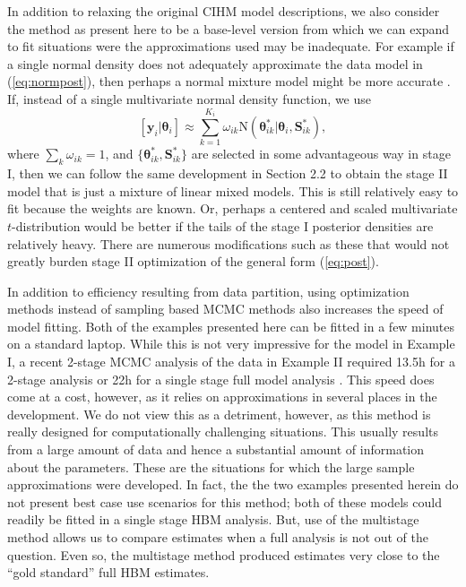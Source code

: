 \documentclass[12pt]{article}
\newcommand{\by}{\mathbf{y}}
\newcommand{\bt}{\boldsymbol{\theta}}
\newcommand{\bS}{\mathbf{S}}
\begin{document}
In addition to relaxing the original CIHM model descriptions, we also consider the method as present here to be a base-level version from which we can expand to fit situations were the approximations used may be inadequate. For example if a single normal density does not adequately approximate the data model in (\ref{eq:normpost}), then perhaps a normal mixture model might be more accurate \citep{gelman2013bayesian}. If, instead of a single multivariate normal density function, we use     
\[
[\by_i|\bt_i] \approx \sum_{k=1}^{K_i}\omega_{ik}\text{N}(\bt_{ik}^*|\bt_{i}, \bS_{ik}^*),
\]
where $\sum_k \omega_{ik} = 1$, and $\{\bt_{ik}^*, \bS_{ik}^*\}$ are selected in some advantageous way in stage I, then we can follow the same development in Section 2.2 to obtain the stage II model that is just a mixture of linear mixed models. This is still relatively easy to fit because the weights are known. Or, perhaps a centered and scaled multivariate $t$-distribution would be better if the tails of the stage I posterior densities are relatively heavy. There are numerous modifications such as these that would not greatly burden stage II optimization of the general form (\ref{eq:post}).

In addition to efficiency resulting from data partition, using optimization methods instead of sampling based MCMC methods also increases the speed of model fitting. Both of the examples presented here can be fitted in a few minutes on a standard laptop. While this is not very impressive for the model in Example I, a recent 2-stage MCMC analysis of the data in Example II required 13.5h for a 2-stage analysis or 22h for a single stage full model analysis \citep{goudie2019joining}. This speed does come at a cost, however, as it relies on approximations in several places in the development. We do not view this as a detriment, however, as this method is really designed for computationally challenging situations. This usually results from a large amount of data and hence a substantial amount of information about the parameters. These are the situations for which the large sample approximations were developed. In fact, the the two examples presented herein do not present best case use scenarios for this method; both of these models could readily be fitted in a single stage HBM analysis. But, use of the multistage method allows us to compare estimates when a full analysis is not out of the question. Even so, the multistage method produced estimates very close to the ``gold standard'' full HBM estimates.
\end{document}
